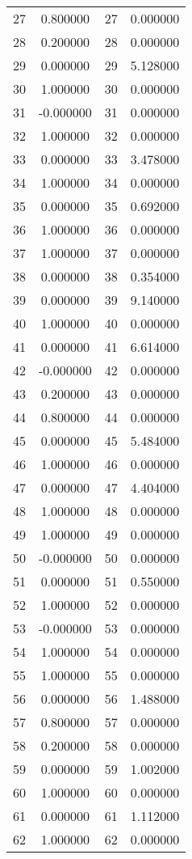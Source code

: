 \documentclass[12pt]{article}
\begin{document}
\begin{longtable}{@{}cccc@{}}
27 & 0.800000 & 27 & 0.000000 \\
28 & 0.200000 & 28 & 0.000000 \\
29 & 0.000000 & 29 & 5.128000 \\
30 & 1.000000 & 30 & 0.000000 \\
31 & -0.000000 & 31 & 0.000000 \\
32 & 1.000000 & 32 & 0.000000 \\
33 & 0.000000 & 33 & 3.478000 \\
34 & 1.000000 & 34 & 0.000000 \\
35 & 0.000000 & 35 & 0.692000 \\
36 & 1.000000 & 36 & 0.000000 \\
37 & 1.000000 & 37 & 0.000000 \\
38 & 0.000000 & 38 & 0.354000 \\
39 & 0.000000 & 39 & 9.140000 \\
40 & 1.000000 & 40 & 0.000000 \\
41 & 0.000000 & 41 & 6.614000 \\
42 & -0.000000 & 42 & 0.000000 \\
43 & 0.200000 & 43 & 0.000000 \\
44 & 0.800000 & 44 & 0.000000 \\
45 & 0.000000 & 45 & 5.484000 \\
46 & 1.000000 & 46 & 0.000000 \\
47 & 0.000000 & 47 & 4.404000 \\
48 & 1.000000 & 48 & 0.000000 \\
49 & 1.000000 & 49 & 0.000000 \\
50 & -0.000000 & 50 & 0.000000 \\
51 & 0.000000 & 51 & 0.550000 \\
52 & 1.000000 & 52 & 0.000000 \\
53 & -0.000000 & 53 & 0.000000 \\
54 & 1.000000 & 54 & 0.000000 \\
55 & 1.000000 & 55 & 0.000000 \\
56 & 0.000000 & 56 & 1.488000 \\
57 & 0.800000 & 57 & 0.000000 \\
58 & 0.200000 & 58 & 0.000000 \\
59 & 0.000000 & 59 & 1.002000 \\
60 & 1.000000 & 60 & 0.000000 \\
61 & 0.000000 & 61 & 1.112000 \\
62 & 1.000000 & 62 & 0.000000 \\

\end{longtable}
\end{document}
